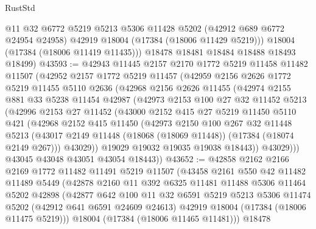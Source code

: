 \begin{lexlean}{RustStd}
\begin{coremodule}
          @11
          @32
          @6772
          @5219
          @5213
          @5306
          @11428
          @5202
          (@42912 @689 @6772 @24954 @24958)
          @42919
          @18004
          (@17384 (@18006 @11429 @5219)))
        @18004
        (@17384 (@18006 @11419 @11435)))
      @18478
      @18481
      @18484
      @18488
      @18493
      @18499)
@43593 := @42943
    @11445
    @2157
    @2170
    @1772
    @5219
    @11458
    @11482
    @11507
    (@42952
      @2157
      @1772
      @5219
      @11457
      (@42959
        @2156
        @2626
        @1772
        @5219
        @11455
        @5110
        @2636
        (@42968
          @2156
          @2626
          @11455
          (@42974
            @2155
            @881
            @33
            @5238
            @11454
            @42987
            (@42973
              @2153
              @100
              @27
              @32
              @11452
              @5213
              (@42996
                @2153
                @27
                @11452
                (@43000
                  @2152
                  @415
                  @27
                  @5219
                  @11450
                  @5110
                  @421
                  (@42968
                    @2152
                    @415
                    @11450
                    (@42973
                      @2150
                      @100
                      @267
                      @32
                      @11448
                      @5213
                      (@43017 @2149 @11448 (@18068 (@18069 @11448)) (@17384 (@18074 @2149 @267)))
                      @43029))
                  @19029
                  @19032
                  @19035
                  @19038
                  @18443))
              @43029)))
        @43045
        @43048
        @43051
        @43054
        @18443))
@43652 := @42858
    @2162
    @2166
    @2169
    @1772
    @11482
    @11491
    @5219
    @11507
    (@43458
      @2161
      @550
      @42
      @11482
      @11489
      @5449
      (@42878
        @2160
        @11
        @392
        @6325
        @11481
        @11488
        @5306
        @11464
        @5202
        @42898
        (@42877
          @642
          @100
          @11
          @32
          @6591
          @5219
          @5213
          @5306
          @11474
          @5202
          (@42912 @641 @6591 @24609 @24613)
          @42919
          @18004
          (@17384 (@18006 @11475 @5219)))
        @18004
        (@17384 (@18006 @11465 @11481)))
      @18478

\end{coremodule}
\end{lexlean}
